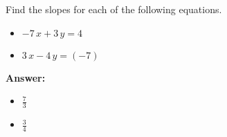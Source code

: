  Find the slopes for each of the following equations. \begin{itemize}\item \( -7 \, x + 3 \, y = 4 \)\item \( 3 \, x - 4 \, y = \left(-7\right) \)\end{itemize}

        \textbf{Answer:} \begin{itemize}\item \( \frac{7}{3} \)\item \( \frac{3}{4} \)\end{itemize}
